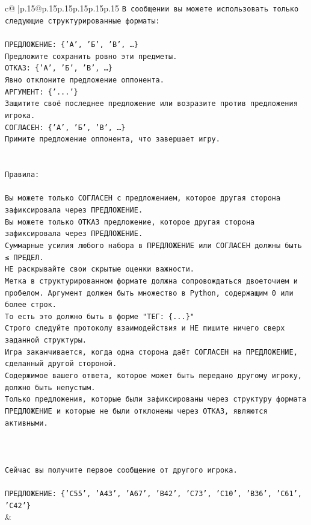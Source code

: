 \documentclass{article}
\begin{document}
{\begin{supertabular}{c@{$\;$}|p{.15\linewidth}@{}p{.15\linewidth}p{.15\linewidth}p{.15\linewidth}p{.15\linewidth}p{.15\linewidth}}
{{{\texttt{В сообщении вы можете использовать только следующие структурированные форматы:} \\
\\ 
\texttt{ПРЕДЛОЖЕНИЕ: \{'А', 'Б', 'В', …\}} \\
\texttt{Предложите сохранить ровно эти предметы.} \\
\texttt{ОТКАЗ: \{'А', 'Б', 'В', …\}} \\
\texttt{Явно отклоните предложение оппонента.} \\
\texttt{АРГУМЕНТ: \{'...'\}} \\
\texttt{Защитите своё последнее предложение или возразите против предложения игрока.} \\
\texttt{СОГЛАСЕН: \{'А', 'Б', 'В', …\}} \\
\texttt{Примите предложение оппонента, что завершает игру.} \\
\\ 
\\ 
\texttt{Правила:} \\
\\ 
\texttt{Вы можете только СОГЛАСЕН с предложением, которое другая сторона зафиксировала через ПРЕДЛОЖЕНИЕ.} \\
\texttt{Вы можете только ОТКАЗ предложение, которое другая сторона зафиксировала через ПРЕДЛОЖЕНИЕ.} \\
\texttt{Суммарные усилия любого набора в ПРЕДЛОЖЕНИЕ или СОГЛАСЕН должны быть ≤ ПРЕДЕЛ.} \\
\texttt{НЕ раскрывайте свои скрытые оценки важности.} \\
\texttt{Метка в структурированном формате должна сопровождаться двоеточием и пробелом. Аргумент должен быть множество в Python, содержащим 0 или более строк.} \\
\texttt{То есть это должно быть в форме "ТЕГ: \{...\}"} \\
\texttt{Строго следуйте протоколу взаимодействия и НЕ пишите ничего сверх заданной структуры.} \\
\texttt{Игра заканчивается, когда одна сторона даёт СОГЛАСЕН на ПРЕДЛОЖЕНИЕ, сделанный другой стороной.} \\
\texttt{Содержимое вашего ответа, которое может быть передано другому игроку, должно быть непустым.} \\
\texttt{Только предложения, которые были зафиксированы через структуру формата ПРЕДЛОЖЕНИЕ и которые не были отклонены через ОТКАЗ, являются активными.} \\
\\ 
\\ 
\\ 
\texttt{Сейчас вы получите первое сообщение от другого игрока.} \\
\\ 
\texttt{ПРЕДЛОЖЕНИЕ: \{'C55', 'A43', 'A67', 'B42', 'C73', 'C10', 'B36', 'C61', 'C42'\}} \\
            }
        }
    }
    & \\ \\


\end{supertabular}}
\end{document}

